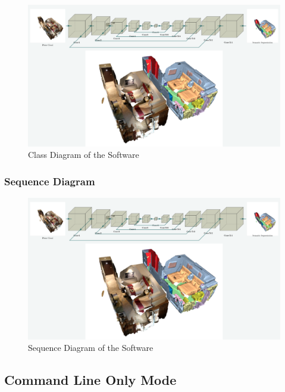 \documentclass[11pt, a4paper,oneside,chapterprefix=false]{scrbook}
\begin{document}
\begin{minipage}{\textwidth}
	\begin{figure}[H]
		\centering
		\includegraphics*[width=1.0\textwidth]{figures/Minkowski Engine.png}
		\caption{Class Diagram of the Software}
		\label{fig:class diagram}
	\end{figure}
\end{minipage}

\subsubsection{Sequence Diagram}

\begin{minipage}{\textwidth}
    \begin{figure}[H]
        \centering
        \includegraphics*[width=1.0\textwidth]{figures/Minkowski Engine.png}
        \caption{Sequence Diagram of the Software}
        \label{fig:sequence diagram}
    \end{figure}
\end{minipage}

\subsection{Command Line Only Mode}
\end{document}
